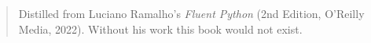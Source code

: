 \frontmatter

\begin{quote}
Distilled from Luciano Ramalho's \emph{Fluent Python} (2nd Edition,
O'Reilly Media, 2022). Without his work this book would not exist.
\end{quote}
